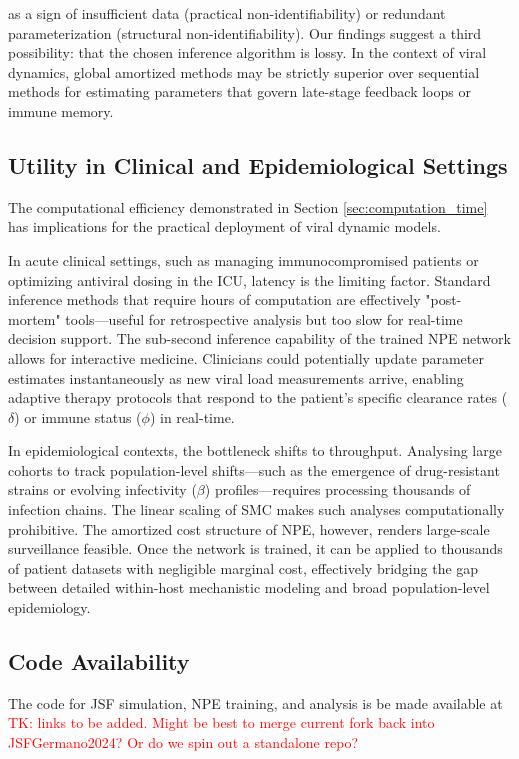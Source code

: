 \documentclass{article}
\begin{document}
as a sign of insufficient data (practical non-identifiability) or redundant parameterization (structural non-identifiability). Our findings suggest a third possibility: that the chosen inference algorithm is lossy. In the context of viral dynamics, global amortized methods may be strictly superior over sequential methods for estimating parameters that govern late-stage feedback loops or immune memory.

\subsection{Utility in Clinical and Epidemiological Settings}\label{sec:clinical_implications}

The computational efficiency demonstrated in Section \ref{sec:computation_time} has  implications for the practical deployment of viral dynamic models.

In acute clinical settings, such as managing immunocompromised patients or optimizing antiviral dosing in the ICU, latency is the limiting factor. Standard inference methods that require hours of computation are effectively "post-mortem" tools—useful for retrospective analysis but too slow for real-time decision support. The sub-second inference capability of the trained NPE network allows for interactive medicine. Clinicians could potentially update parameter estimates instantaneously as new viral load measurements arrive, enabling adaptive therapy protocols that respond to the patient's specific clearance rates ($\delta$) or immune status ($\phi$) in real-time.

In epidemiological contexts, the bottleneck shifts to throughput. Analysing large cohorts to track population-level shifts—such as the emergence of drug-resistant strains or evolving infectivity ($\beta$) profiles—requires processing thousands of infection chains. The linear scaling of SMC makes such analyses computationally prohibitive. The amortized cost structure of NPE, however, renders large-scale surveillance feasible. Once the network is trained, it can be applied to thousands of patient datasets with negligible marginal cost, effectively bridging the gap between detailed within-host mechanistic modeling and broad population-level epidemiology.




\subsection{Code Availability}
The code for JSF simulation, NPE training, and analysis is be made available at \textcolor{red}{TK: links to be added. Might be best to merge current fork back into JSFGermano2024? Or do we spin out a standalone repo?}
\end{document}

